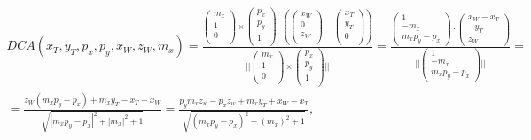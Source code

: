 \documentclass[a4paper,11pt]{article}
\begin{document}
\begin{equation}
\begin{split}
DCA(x_T, y_T, p_x, p_y, x_W, z_W, m_x) = \frac{\begin{pmatrix} m_x \\ 1\\  0\\\end{pmatrix} \times \begin{pmatrix} p_x\\ p_y \\  1\\\end{pmatrix} \cdot (\begin{pmatrix}x_W  \\0 \\  z_W\\\end{pmatrix} - \begin{pmatrix}x_T \\y_T  \\  0\\\end{pmatrix}) }{||\begin{pmatrix} m_x \\ 1\\  0\\\end{pmatrix} \times \begin{pmatrix}p_x\\ p_y \\  1\\\end{pmatrix}||} =  \frac{\begin{pmatrix} 1 \\ -m_x \\ m_xp_y - p_x  \end{pmatrix} \cdot
\begin{pmatrix} x_W-x_T \\ -y_T \\ z_W  \end{pmatrix} }{||\begin{pmatrix} 1 \\ -m_x \\ m_xp_y - p_x  \end{pmatrix}||}  = \\
= \frac{z_W (m_x p_y-p_x)+m_x y_T-x_T+x_W}{\sqrt{\left| m_x p_y-p_x\right|^2+\left| m_x\right|^2+1}}
= \frac{ p_ym_xz_w-p_xz_w + m_xy_T + x_W - x_T }{\sqrt{(m_x p_y-p_x)^2+(m_x)^2+1}},
\label{eq:DCAGeom}
\end{split}
\end{equation}
\end{document}
